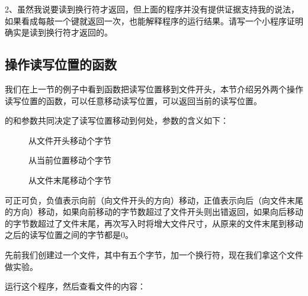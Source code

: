 2、虽然我说要读到换行符才返回，但上面的程序并没有提供证据支持我的说法，如果看成每敲一个键就返回一次，也能解释程序的运行结果。请写一个小程序证明确实是读到换行符才返回的。


\subsection{操作读写位置的函数}
%


我们在上一节的例子中看到函数把读写位置移到文件开头，本节介绍另外两个操作读写位置的函数，可以任意移动读写位置，可以返回当前的读写位置。




的和参数共同决定了读写位置移动到何处，参数的含义如下：


\begin{description}
\item[{}]


从文件开头移动个字节

\item[{}]


从当前位置移动个字节

\item[{}]


从文件末尾移动个字节


\end{description}


可正可负，负值表示向前（向文件开头的方向）移动，正值表示向后（向文件末尾的方向）移动，如果向前移动的字节数超过了文件开头则出错返回，如果向后移动的字节数超过了文件末尾，再次写入时将增大文件尺寸，从原来的文件末尾到移动之后的读写位置之间的字节都是0。



先前我们创建过一个文件，其中有五个字节，加一个换行符，现在我们拿这个文件做实验。





运行这个程序，然后查看文件的内容：


